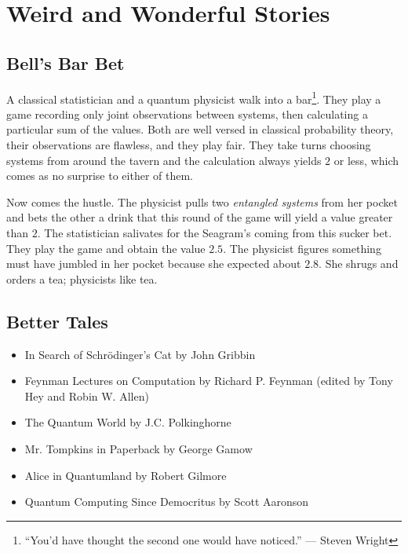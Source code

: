 \section*{Weird and Wonderful Stories}

\subsection*{Bell's Bar Bet}
A classical statistician and a quantum physicist walk into a bar\footnote{%
  ``You'd have thought the second one would have noticed.'' --- Steven
  Wright%
}. They play a game recording only joint observations between systems, then
calculating a particular sum of the values. Both are well versed in
classical probability theory, their observations are flawless, and they
play fair. They take turns choosing systems from around the tavern and the
calculation always yields $2$ or less, which comes as no surprise to either
of them. 



Now comes the hustle. The physicist pulls two \emph{entangled
  systems} from her pocket and bets the other a drink that this round of the
game will yield a value greater than $2$. The statistician salivates for
the Seagram's coming from this sucker bet. They play the game and obtain
the value $2.5$. The physicist figures something must have jumbled in her
pocket because she expected about $2.8$. She shrugs and orders a tea;
physicists like tea.

\subsection*{Better Tales}
\begin{footnotesize}
  
\begin{itemize}
\item \textsf{In Search of Schr\"odinger's Cat} by John Gribbin
\item \textsf{Feynman Lectures on Computation} by Richard P. Feynman
  (edited by Tony Hey and Robin W. Allen)
\item \textsf{The Quantum World} by J.C. Polkinghorne
\item \textsf{Mr. Tompkins in Paperback} by George Gamow
\item \textsf{Alice in Quantumland} by Robert Gilmore
\item \textsf{Quantum Computing Since Democritus} by Scott Aaronson
\end{itemize}
\end{footnotesize}